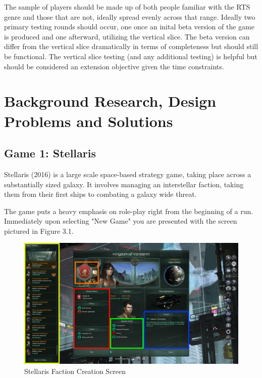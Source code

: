 \documentclass{report}
\begin{document}
The sample of players should be made up of both people familiar with the RTS genre and those that are not, ideally spread evenly across that range. Ideally two primary testing rounds should occur, one once an inital beta version of the game is produced and one afterward, utilizing the vertical slice. The beta version can differ from the vertical slice dramatically in terms of completeness but should still be functional.
The vertical slice testing (and any additional testing) is helpful but should be considered an extension objective given the time constraints.

\pagebreak
\section{Background Research, Design Problems and Solutions}

\subsection{Game 1: Stellaris}

Stellaris (2016) \cite{stellaris} is a large scale space-based strategy game, taking place across a substantially sized galaxy. It involves managing an interstellar faction, taking them from their first ships to combating a galaxy wide threat. 

The game puts a heavy emphasis on role-play right from the beginning of a run. Immediately upon selecting "New Game" you are presented with the screen pictured in Figure 3.1.

\begin{figure}[h]
    \includegraphics[width=\textwidth]{stellaris_faction_creation.png}
    \caption{Stellaris Faction Creation Screen}
\end{figure}
\end{document}
